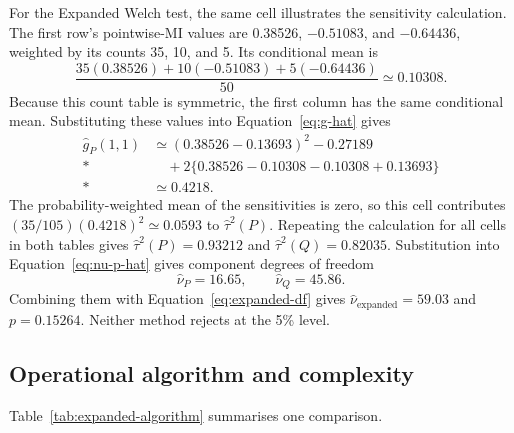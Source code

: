 For the Expanded Welch test, the same cell illustrates the sensitivity calculation.
The first row's pointwise-MI values are 0.38526, \(-0.51083\), and
\(-0.64436\), weighted by its counts 35, 10, and 5. Its conditional mean is
\begin{equation*}
 \frac{35(0.38526)+10(-0.51083)+5(-0.64436)}{50}
 \simeq0.10308.
\end{equation*}
Because this count table is symmetric, the first column has the same
conditional mean. Substituting these values into Equation~\eqref{eq:g-hat} gives
\begin{align*}
 \widehat g_P(1,1)
 &\simeq (0.38526-0.13693)^2-0.27189\\*
 &\quad+2\{0.38526-0.10308-0.10308+0.13693\}\\*
 &\simeq0.4218.
\end{align*}
The probability-weighted mean of the sensitivities is zero, so this cell
contributes \((35/105)(0.4218)^2\simeq0.0593\) to
\(\widehat\tau^2(P)\). Repeating the calculation for all cells in both
tables gives \(\widehat\tau^2(P)=0.93212\) and
\(\widehat\tau^2(Q)=0.82035\). Substitution into
Equation~\eqref{eq:nu-p-hat} gives component degrees of freedom
\begin{equation}
  \widehat\nu_P=16.65,
  \qquad
  \widehat\nu_Q=45.86.
\end{equation}
Combining them with Equation~\eqref{eq:expanded-df} gives
\(\widehat\nu_{\mathrm{expanded}}=59.03\) and \(p=0.15264\).
Neither method rejects at the 5\% level.

\pagebreak[3]
\subsection{Operational algorithm and complexity}
\label{sec:expanded-complexity}

Table~\ref{tab:expanded-algorithm} summarises one comparison.

